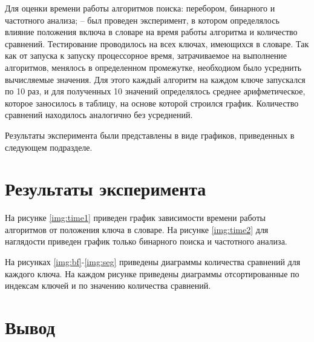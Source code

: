 Для оценки времени работы алгоритмов поиска: перебором, бинарного и частотного
анализа; -- был проведен эксперимент, в котором определялось влияние положения
включа в словаре на время работы алгоритма и количество сравнений. Тестирование
проводилось на всех ключах, имеющихся в словаре. Так как от запуска к запуску
процессорное время, затрачиваемое на выполнение алгоритмов, менялось в
определенном промежутке, необходиом было усреднить вычисляемые значения. Для
этого каждый алгоритм на каждом ключе запускался по 10 раз, и для полученных 10
значений определялось среднее арифметическое, которое заносилось в таблицу, на
основе которой строился график. Количество сравнений находилось аналогично без
усреднений.

Результаты эксперимента были представлены в виде графиков, приведенных
в следующем подразделе.

\section{Результаты эксперимента}

На рисунке \ref{img:time1} приведен график зависимости времени работы
алгоритмов от положения ключа в словаре. На рисунке \ref{img:time2} для
наглядости приведен график только бинарного поиска и частотного анализа.

На рисунках \ref{img:bf}-\ref{img:seg} приведены диаграммы количества сравнений
для каждого ключа. На каждом рисунке приведены диаграммы отсортированные по
индексам ключей и по значению количества сравнений.






\clearpage
\section{Вывод}


